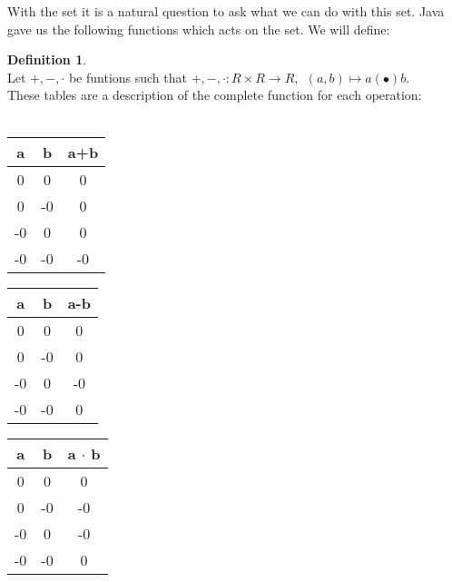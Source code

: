 \documentclass[12pt]{report}
\theoremstyle{definition}
\newtheorem{definition}{Definition}[section]
\theoremstyle{remark}
\begin{document}
    With the set it is a natural question to ask what we can do with this set.
    Java gave us the following functions which acts on the set. We will define:

    \begin{definition}$\ $\\
    Let $+, -, \cdot $ be funtions such that $+, -, \cdot : R \times R \rightarrow R,\ \ (a,b) \mapsto a(\bullet)b$. \\ These tables are a description of the complete function for each operation: \\\\
      \begin{minipage}{0.25\textwidth}
        \begin{center}
          \begin{tabular}{| c | c || c |} \hline
            a & b & a+b \\ \hline
            0 & 0 & 0 \\ \hline
            0 & -0 & 0 \\ \hline
            -0 & 0 & 0 \\ \hline
            -0 & -0 & -0 \\ \hline
          \end{tabular}
        \end{center}
      \end{minipage}
      \begin{minipage}{0.25\textwidth}
        \begin{center}
          \begin{tabular}{| c | c || c |} \hline
            a & b & a-b \\ \hline
            0 & 0 & 0 \\ \hline
            0 & -0 & 0 \\ \hline
            -0 & 0 & -0 \\ \hline
            -0 & -0 & 0 \\ \hline
          \end{tabular}
        \end{center}
      \end{minipage}
      \begin{minipage}{0.25\textwidth}
        \begin{center}
          \begin{tabular}{| c | c || c |} \hline
            a & b & a $\cdot$ b \\ \hline
            0 & 0 & 0 \\ \hline
            0 & -0 & -0 \\ \hline
            -0 & 0 & -0 \\ \hline
            -0 & -0 & 0 \\ \hline
          \end{tabular}
        \end{center}
      \end{minipage}
    \end{definition}
\end{document}

